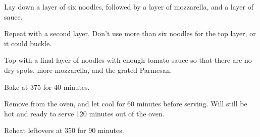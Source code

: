 \begin{recipe}
Lay down a layer of six noodles, followed by a layer of mozzarella, and a layer of sauce.

Repeat with a second layer. Don't use more than six noodles for the top layer, or it could buckle. 


Top with a final layer of noodles with enough tomato sauce so that there are no dry spots, more mozzarella, and the grated Parmesan.

Bake at 375\degree{} for 40 minutes.

Remove from the oven, and let cool for 60 minutes before serving. Will still be hot and ready to serve 120 minutes out of the oven. 

Reheat leftovers at 350\degree{} for 90 minutes. 

\end{recipe}
